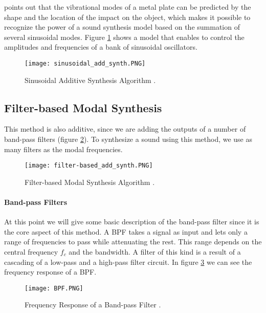 \cite{Cook:2002:RSS:515316} points out that the vibrational modes of a  metal plate can be predicted by the shape and the location of the impact on the object, which makes it possible to recognize the power of a sound synthesis model based on the summation of several sinusoidal modes. Figure \ref{fig:sin_add_synth} shows a model that enables to control the amplitudes and frequencies of a bank of sinusoidal oscillators.

\begin{figure}[H]
  \centering
    \texttt{[image: sinusoidal\_add\_synth.PNG]}
      \caption{Sinusoidal Additive Synthesis Algorithm \cite{Cook:2002:RSS:515316}.}
      \label{fig:sin_add_synth}
\end{figure}

\subsection{Filter-based Modal Synthesis}\label{sec:add_synth}

This method is also additive, since we are adding the outputs of a number of band-pass filters (figure \ref{fig:filter_synth}). To synthesize a sound using this method, we use as many filters as the modal frequencies.

\begin{figure}[H]
  \centering
    \texttt{[image: filter-based\_add\_synth.PNG]}
      \caption{Filter-based Modal Synthesis Algorithm \cite{Cook:2002:RSS:515316}.}
      \label{fig:filter_synth}
\end{figure}

\paragraph{Band-pass Filters}\label{par:bpf}
\hfill \break

At this point we will give some basic description of the band-pass filter since it is the core aspect of this method. A \gls{BPF} takes a signal as input and lets only a range of frequencies to pass while attenuating the rest. This range depends on the central frequency $f_c$ and the bandwidth. A filter of this kind is a result of a cascading of a low-pass and a high-pass filter circuit.
In figure \ref{fig:resp_bpf} we can see the frequency response of a \gls{BPF}. 

\begin{figure}[H]
  \centering
    \texttt{[image: BPF.PNG]}
      \caption{Frequency Response of a Band-pass Filter  \cite{bib:bpf}.}
      \label{fig:resp_bpf}
\end{figure}

